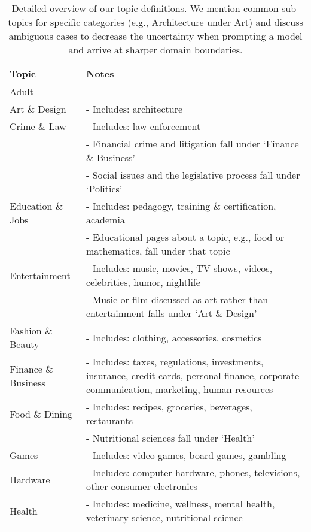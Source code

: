 \begin{table}[h!]
    \centering
    \ificml\small\else\footnotesize\fi
    \caption{Detailed overview of our {\topics topic definitions}. 
    We mention common sub-topics for specific categories (e.g., Architecture under Art) and discuss ambiguous cases to decrease the uncertainty when prompting a model and arrive at sharper domain boundaries.}
    \icmlskip{0.1in}
\begin{tabular}{l@{\hspace{8pt}}p{}}
\toprule
Topic & Notes \\
\midrule
Adult  & \\
\addlinespace[0.05in]
Art \& Design & - Includes: architecture \\
\addlinespace[0.05in]
Crime \& Law & - Includes: law enforcement \\ 
             & - Financial crime and litigation fall under `Finance \& Business' \\
             & - Social issues and the legislative process fall under `Politics' \\
\addlinespace[0.05in]
Education \& Jobs & - Includes: pedagogy, training \& certification, academia\\
            & - Educational pages about a topic, e.g., food or mathematics, fall under that topic \\
\addlinespace[0.05in]
Entertainment & - Includes: music, movies, TV shows, videos, celebrities, humor, nightlife \\
            & - Music or film discussed as art rather than entertainment falls under `Art \& Design' \\
\addlinespace[0.05in]
Fashion \& Beauty & - Includes: clothing, accessories, cosmetics\\
\addlinespace[0.05in]
Finance \& Business & - Includes: taxes, regulations, investments, insurance, credit cards, personal finance, corporate communication, marketing, human resources \\
\addlinespace[0.05in]
Food \& Dining & - Includes: recipes, groceries, beverages, restaurants \\
& - Nutritional sciences fall under `Health' \\
\addlinespace[0.05in]
Games & - Includes: video games, board games, gambling \\
\addlinespace[0.05in]
Hardware & - Includes: computer hardware, phones, televisions, other consumer electronics \\
\addlinespace[0.05in]
Health & - Includes: medicine, wellness, mental health, veterinary science, nutritional science \\

\end{tabular}
\end{table}
